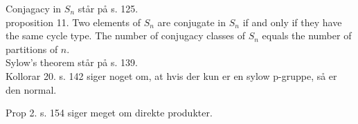 \documentclass[11pt]{article}
\begin{document}
Conjagacy in $S_n$ står på s. 125.\\

proposition 11. Two elements of $S_n$ are conjugate in $S_n$ if and only if they have the same cycle type. The number of conjugacy classes of $S_n$ equals the number of partitions of $n$.\\

Sylow's theorem står på s. 139.\\

Kollorar 20. s. 142 siger noget om, at hvis der kun er en sylow p-gruppe, så er den normal.

Prop 2. s. 154 siger meget om direkte produkter.\\
\end{document}
